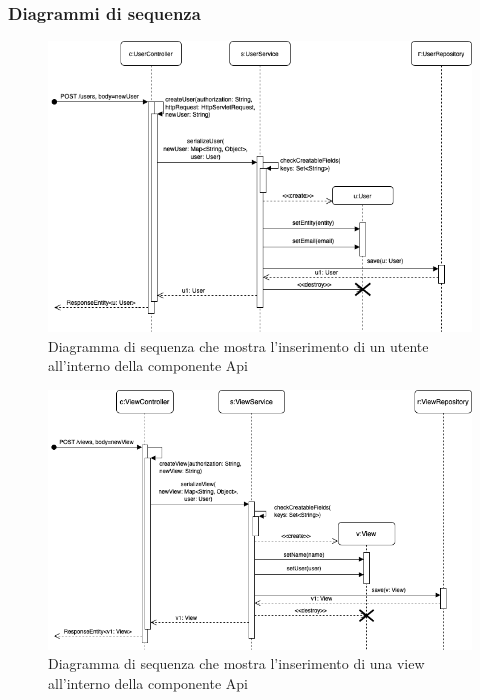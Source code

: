 \begin{landscape}
	\subsubsection{Diagrammi di sequenza}
		\begin{figure}[H]
			\centering
			\includegraphics[scale=0.550]{res/images/API/inserimento_utente.png}
			\caption{Diagramma di sequenza che mostra l'inserimento di un utente all'interno della componente Api}
		\end{figure}
		\begin{figure}[H]
			\centering
			\includegraphics[scale=0.550]{res/images/API/inserimento_view.png}
			\caption{Diagramma di sequenza che mostra l'inserimento di una view all'interno della componente Api}
		\end{figure}
	\end{landscape}

